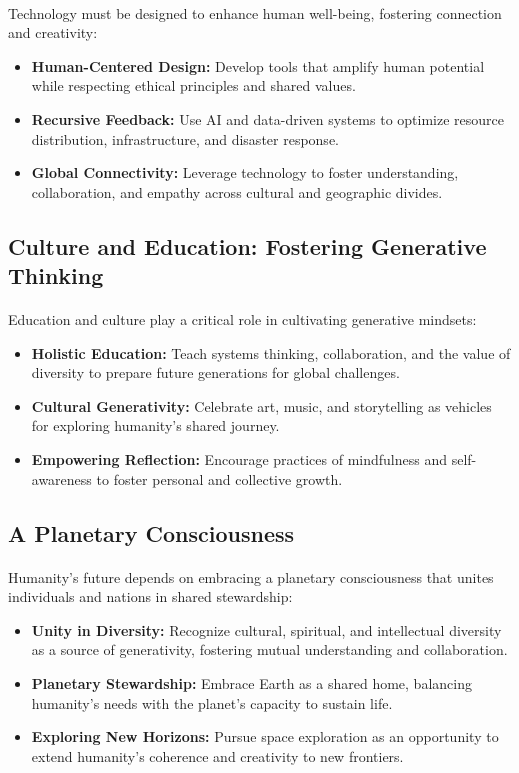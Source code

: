 \documentclass[12pt]{article}
\begin{document}
\paragraph{}
Technology must be designed to enhance human well-being, fostering connection and creativity:
\begin{itemize}
    \item \textbf{Human-Centered Design:} Develop tools that amplify human potential while respecting ethical principles and shared values.
    \item \textbf{Recursive Feedback:} Use AI and data-driven systems to optimize resource distribution, infrastructure, and disaster response.
    \item \textbf{Global Connectivity:} Leverage technology to foster understanding, collaboration, and empathy across cultural and geographic divides.
\end{itemize}

\subsection{Culture and Education: Fostering Generative Thinking}
\paragraph{}
Education and culture play a critical role in cultivating generative mindsets:
\begin{itemize}
    \item \textbf{Holistic Education:} Teach systems thinking, collaboration, and the value of diversity to prepare future generations for global challenges.
    \item \textbf{Cultural Generativity:} Celebrate art, music, and storytelling as vehicles for exploring humanity’s shared journey.
    \item \textbf{Empowering Reflection:} Encourage practices of mindfulness and self-awareness to foster personal and collective growth.
\end{itemize}

\subsection{A Planetary Consciousness}
\paragraph{}
Humanity’s future depends on embracing a planetary consciousness that unites individuals and nations in shared stewardship:
\begin{itemize}
    \item \textbf{Unity in Diversity:} Recognize cultural, spiritual, and intellectual diversity as a source of generativity, fostering mutual understanding and collaboration.
    \item \textbf{Planetary Stewardship:} Embrace Earth as a shared home, balancing humanity’s needs with the planet’s capacity to sustain life.
    \item \textbf{Exploring New Horizons:} Pursue space exploration as an opportunity to extend humanity’s coherence and creativity to new frontiers.
\end{itemize}
\end{document}
